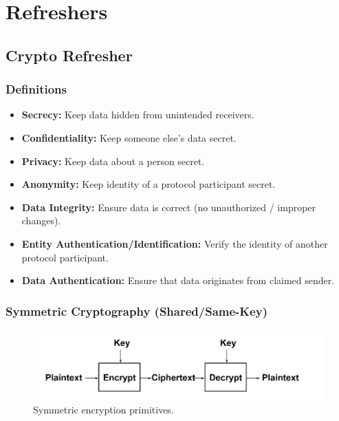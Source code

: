 \section{Refreshers}

\subsection{Crypto Refresher}

\subsubsection{Definitions}

\begin{itemize}
    \item \textbf{Secrecy:} Keep data hidden from unintended receivers.
    
    \item \textbf{Confidentiality:} Keep someone else's data secret.
    
    \item \textbf{Privacy:} Keep data about a person secret.
    
    \item \textbf{Anonymity:} Keep identity of a protocol participant secret.
    
    \item \textbf{Data Integrity:} Ensure data is correct (no unauthorized / improper changes).
    
    \item \textbf{Entity Authentication/Identification:} Verify the identity of another protocol participant.
    
    \item \textbf{Data Authentication:} Ensure that data originates from claimed sender.
\end{itemize}

\subsubsection{Symmetric Cryptography (Shared/Same-Key)}

\begin{figure}[h]
	\centering
	\includegraphics[scale=0.5]{images/1-symm_crypto.PNG}
	\caption{Symmetric encryption primitives.}
	\label{fig:sym_crypto}
\end{figure}

